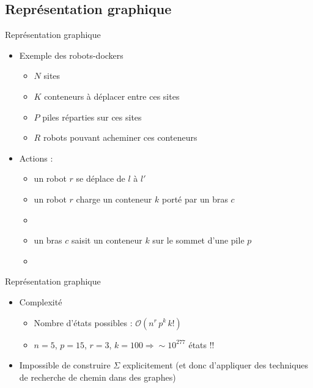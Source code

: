 \documentclass[compress]{beamer}
\begin{document}
\subsection{Représentation graphique}
\begin{frame}{Représentation graphique}
\begin{itemize}
\item Exemple des robots-dockers
	\begin{itemize}
	\item $N$ sites
	\item $K$ conteneurs à déplacer entre ces sites
	\item $P$ piles réparties sur ces sites
	\item $R$ robots pouvant acheminer ces conteneurs
	\end{itemize}
\item Actions :
	\begin{itemize}
	\item {} un robot $r$ se déplace de $l$ à $l'$
	\item {} un robot $r$ charge un conteneur $k$ porté par un bras $c$
	\item {}
	\item {} un bras $c$ saisit un conteneur $k$ sur le sommet d'une pile $p$
	\item {}
	\end{itemize}
\end{itemize}
\end{frame}

\begin{frame}{Représentation graphique}
\begin{itemize}
\item Complexité
	\begin{itemize}
	\item Nombre d'états possibles : $\mathcal{O}(n^r \, p^k \, k!)$
	\item $n = 5$, $p = 15$, $r = 3$, $k = 100 \Rightarrow \sim 10^{277}$ états !!
	\end{itemize}
\item Impossible de construire $\Sigma$ explicitement
	(et donc d'appliquer des techniques de recherche de chemin dans des graphes)
\end{itemize}
\end{frame}
\end{document}

